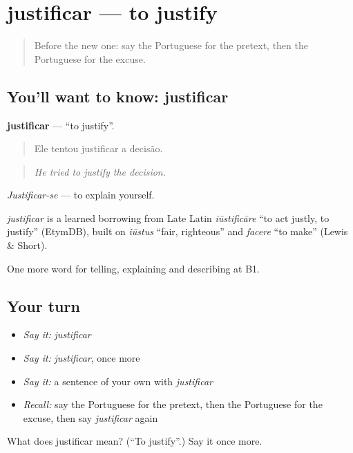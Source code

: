 \section[justificar]{justificar — to justify}

\label{lesson:PT-C352-justificar}



\begin{quote}
Before the new one: say the Portuguese for the pretext, then the Portuguese for the excuse.
\end{quote}

\subsection*{You'll want to know: justificar}
\textbf{justificar} — \textquotedblleft{}to justify\textquotedblright{}.

\begin{quote}
Ele tentou justificar a decisão.
\end{quote}

\begin{quote}
\emph{He tried to justify the decision.}
\end{quote}

\emph{Justificar-se} — to explain yourself.

\begin{cousinweb}
\emph{justificar} is a learned borrowing from Late Latin \emph{iūstificāre} \textquotedblleft{}to act justly, to justify\textquotedblright{} (EtymDB), built on \emph{iūstus} \textquotedblleft{}fair, righteous\textquotedblright{} and \emph{facere} \textquotedblleft{}to make\textquotedblright{} (Lewis \& Short).
\end{cousinweb}

\begin{grammarlens}[title={What you've built}]
One more word for telling, explaining and describing at B1.
\end{grammarlens}

\subsection*{Your turn}
\begin{itemize}
\raggedright
  \item \emph{Say it:} \emph{justificar}
  \item \emph{Say it:} \emph{justificar}, once more
  \item \emph{Say it:} a sentence of your own with \emph{justificar}
  \item \emph{Recall:} say the Portuguese for the pretext, then the Portuguese for the excuse, then say \emph{justificar} again
\end{itemize}

\begin{tcolorbox}[breakable,colback=teal!4,colframe=teal!35!black,title={Before you move on}]
What does justificar mean? (\textquotedblleft{}To justify\textquotedblright{}.) Say it once more.
\end{tcolorbox}
